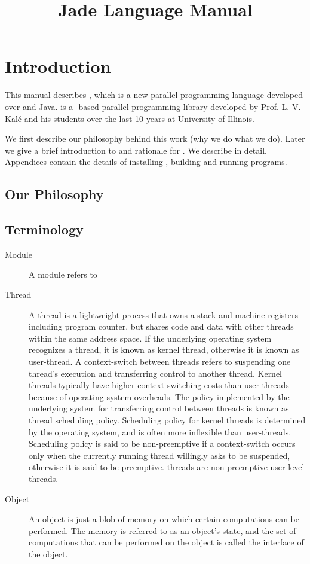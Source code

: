 \documentclass[10pt]{article}
\title{Jade Language Manual}
\begin{document}
\maketitle

\section{Introduction}

This manual describes \jade, which is a new parallel programming language
developed over \charmpp{} and Java. \charmpp{} is a
\CC{}-based parallel programming library developed by Prof. L. V. Kal\'{e} 
and his students over the last 10 years at University of Illinois.

We first describe our philosophy behind this work (why we do what we do).
Later we give a brief introduction to \charmpp{} and rationale for \jade. We
describe \jade in detail. Appendices contain the details of installing
\jade, building and running \jade programs.

\subsection{Our Philosophy}

\subsection{Terminology}

\begin{description}

\item[Module] A module refers to 

\item[Thread] A thread is a lightweight process that owns a stack and machine
registers including program counter, but shares code and data with other
threads within the same address space. If the underlying operating system
recognizes a thread, it is known as kernel thread, otherwise it is known as
user-thread. A context-switch between threads refers to suspending one thread's
execution and transferring control to another thread. Kernel threads typically
have higher context switching costs than user-threads because of operating
system overheads. The policy implemented by the underlying system for
transferring control between threads is known as thread scheduling policy.
Scheduling policy for kernel threads is determined by the operating system, and
is often more inflexible than user-threads. Scheduling policy is said to be
non-preemptive if a context-switch occurs only when the currently running
thread willingly asks to be suspended, otherwise it is said to be preemptive.
\jade threads are non-preemptive user-level threads.

\item[Object] An object is just a blob of memory on which certain computations
can be performed. The memory is referred to as an object's state, and the set
of computations that can be performed on the object is called the interface of
the object.

\end{description}
\end{document}
